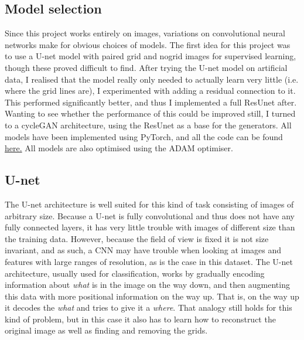 \subsection{Model selection}
Since this project works entirely on images, variations on convolutional neural networks make for obvious choices of models. The first idea for this project was to use a U-net model with paired grid and nogrid images for supervised learning, though these proved difficult to find. After trying the U-net model on artificial data, I realised that the model really only needed to actually learn very little (i.e. where the grid lines are), I experimented with adding a residual connection to it. This performed significantly better, and thus I implemented a full ResUnet after. Wanting to see whether the performance of this could be improved still, I turned to a cycleGAN architecture, using the ResUnet as a base for the generators. All models have been implemented using PyTorch, and all the code can be found \href{https://github.com/Cavtheman/degridifier}{here.} All models are also optimised using the ADAM optimiser.
\subsection{U-net}
The U-net architecture is well suited for this kind of task consisting of images of arbitrary size. Because a U-net is fully convolutional and thus does not have any fully connected layers, it has very little trouble with images of different size than the training data. However, because the field of view is fixed it is not size invariant, and as such, a CNN may have trouble when looking at images and features with large ranges of resolution, as is the case in this dataset. The U-net architecture, usually used for classification, works by gradually encoding information about \textit{what} is in the image on the way down, and then augmenting this data with more positional information on the way up. That is, on the way up it decodes the \textit{what} and tries to give it a \textit{where}. That analogy still holds for this kind of problem, but in this case it also has to learn how to reconstruct the original image as well as finding and removing the grids.

